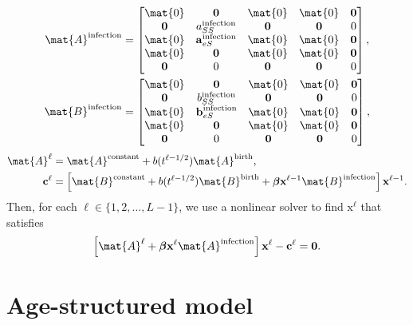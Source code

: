 \documentclass{jpmarticle}
\renewcommand{\vec}[1]{\boldsymbol{\mathrm{#1}}}
\begin{document}
\begin{equation}
  \begin{split}
    \mat{A}^{\text{infection}} &=
    \begin{bmatrix}
      \mat{0} & \vec{0} & \mat{0} & \mat{0} & \vec{0}
      \\
      \vec{0} & a_{SS}^{\text{infection}} & \vec{0} & \vec{0} & 0
      \\
      \mat{0} & \vec{a}_{eS}^{\text{infection}} & \mat{0} & \mat{0} & \vec{0}
      \\
      \mat{0} & \vec{0} & \mat{0} & \mat{0} & \vec{0}
      \\
      \vec{0} & 0 & \vec{0} & \vec{0} & 0
    \end{bmatrix},
    \\
    \mat{B}^{\text{infection}} &=
    \begin{bmatrix}
      \mat{0} & \vec{0} & \mat{0} & \mat{0} & \vec{0}
      \\
      \vec{0} & b_{SS}^{\text{infection}} & \vec{0} & \vec{0} & 0
      \\
      \mat{0} & \vec{b}_{eS}^{\text{infection}} & \mat{0} & \mat{0} & \vec{0}
      \\
      \mat{0} & \vec{0} & \mat{0} & \mat{0} & \vec{0}
      \\
      \vec{0} & 0 & \vec{0} & \vec{0} & 0
    \end{bmatrix},
  \end{split}
\end{equation}
\begin{equation}
  \begin{split}
    \mat{A}^{\ell} &=
    \mat{A}^{\text{constant}}
    + b(t^{\ell - 1 / 2}) \mat{A}^{\text{birth}},
    \\
    \vec{c}^{\ell} &=
    \left[
      \mat{B}^{\text{constant}}
      + b(t^{\ell - 1 / 2}) \mat{B}^{\text{birth}}
      + \vec{\beta} \vec{x}^{\ell - 1} \mat{B}^{\text{infection}}
    \right] \vec{x}^{\ell - 1}.
  \end{split}
\end{equation}
Then, for each $\ell \in \{1, 2, \ldots, L - 1\}$,
we use a nonlinear solver to find $\vec{x}^{\ell}$ that satisfies
\begin{equation}
  \left[
    \mat{A}^{\ell}
    + \vec{\beta} \vec{x}^{\ell} \mat{A}^{\text{infection}}
  \right] \vec{x}^{\ell}
  - \vec{c}^{\ell}
  = \vec{0}.
\end{equation}


\section{Age-structured model}
\end{document}
